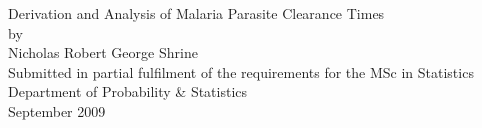 \documentclass[a4paper,12pt,openright,twoside,doublespace]{book}
\begin{document}
\begin{titlepage}
\vspace*{\fill}
\begin{center}
{\huge Derivation and Analysis of Malaria Parasite Clearance Times}\\[1cm]
by\\[1cm]
{\large Nicholas Robert George Shrine}\\[4cm]
Submitted in partial fulfilment of the requirements for the MSc in Statistics\\
Department of Probability \& Statistics\\[2cm]
September 2009
\end{center}
\vspace*{\fill}
\end{titlepage}

\frontmatter
\tableofcontents
\listoffigures 

\mainmatter







{\backmatter
 
{\singlespace}}
\addappheadtotoc
\appendix
\appendixpage

\end{document}

